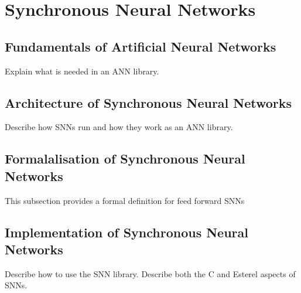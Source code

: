 \section{Synchronous Neural Networks}
\subsection{Fundamentals of Artificial Neural Networks}
Explain what is needed in an ANN library.

\subsection{Architecture of Synchronous Neural Networks}
Describe how SNNs run and how they work as an ANN library.

\subsection{Formalalisation of Synchronous Neural Networks}
This subsection provides a formal definition for feed forward SNNs

\subsection{Implementation of Synchronous Neural Networks}
Describe how to use the SNN library. Describe both the C and Esterel aspects of SNNs.
